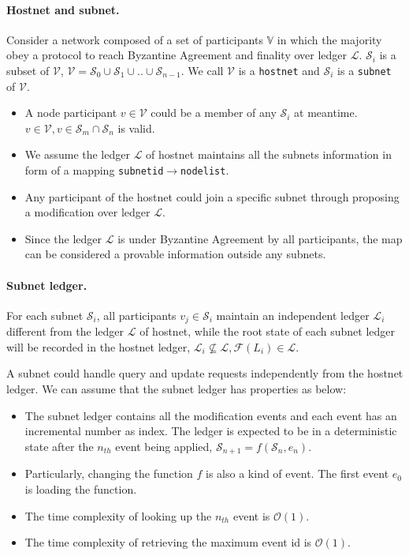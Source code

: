 \documentclass[11pt]{article}
\begin{document}
\paragraph{Hostnet and subnet.}
Consider a network composed of a set of participants $\mathbb{V}$ in which the majority obey a protocol to reach Byzantine Agreement and finality\cite{grandpa} over ledger $\mathcal{L}$.
$\mathcal{S}_{i}$ is a subset of $\mathcal{V}$, \( \mathcal{V} = \mathcal{S}_{0} \cup \mathcal{S}_{1} \cup .. \cup \mathcal{S}_{n-1}  \).
We call $\mathcal{V}$ is a \texttt{hostnet} and $\mathcal{S}_{i}$ is a \texttt{subnet} of $\mathcal{V}$.
\begin{itemize}
\item A node participant \( v \in \mathcal{V} \) could be a member of any $\mathcal{S}_{i}$ at meantime.\( v \in \mathcal{V}, v \in \mathcal{S}_{m} \cap \mathcal{S}_{n} \) is valid.
\item We assume the ledger $\mathcal{L}$ of hostnet maintains all the subnets information in form of a mapping \texttt{subnetid}\( \rightarrow \)\texttt{nodelist}.
\item Any participant of the hostnet could join a specific subnet through proposing a modification over ledger $\mathcal{L}$.
\item Since the ledger $\mathcal{L}$ is under Byzantine Agreement by all participants, the map can be considered a provable information outside any subnets.
\end{itemize}

\paragraph{Subnet ledger.}
For each subnet $\mathcal{S}_{i}$, all participants \(v_{j} \in \mathcal{S}_{i}\) maintain an independent ledger $\mathcal{L}_{i}$ different from the ledger $\mathcal{L}$ of hostnet, while the root state of each subnet ledger will be recorded in the hostnet ledger, \( \mathcal{L}_{i} \nsubseteq \mathcal{L}, \mathcal{F}(L_{i}) \in \mathcal{L} \).

A subnet could handle query and update requests independently from the hostnet ledger.
We can assume that the subnet ledger has properties as below:

\begin{itemize}
\item The subnet ledger contains all the modification events and each event has an incremental number as index.
The ledger is expected to be in a deterministic state after the $n_{th}$ event being applied, \(\mathcal{S}_{n+1} = f(\mathcal{S}_{n}, e_{n})\).
\item Particularly, changing the function $f$ is also a kind of event. The first event $e_{0}$ is loading the function.
\item The time complexity of looking up the $n_{th}$ event is $\mathcal{O}(1)$.
\item The time complexity of retrieving the maximum event id is $\mathcal{O}(1)$.
\end{itemize}
\end{document}
